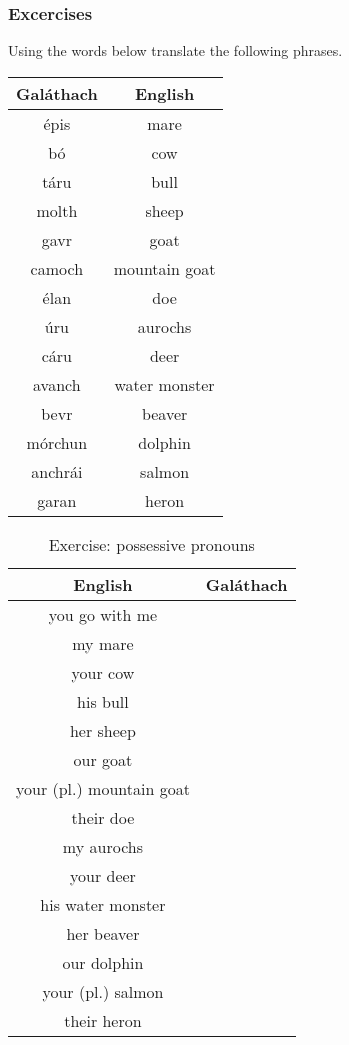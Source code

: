 \newpage
\subsubsection{Excercises}

Using the words below translate the following phrases.
\begin{table}[H]
\centering
\begin{tabular}{|c|c|}
  \toprule
  \textbf{Gal\'{a}thach} & \textbf{English}\\
  \toprule
  \'{e}pis & mare\\
  b\'{o} & cow\\
  t\'{a}ru & bull\\
  molth & sheep\\
  gavr & goat\\
  camoch & mountain goat\\
  \'{e}lan & doe\\
  \'{u}ru & aurochs\\
  c\'{a}ru & deer\\
  avanch & water monster\\
  bevr & beaver\\
  m\'{o}rchun & dolphin\\
  anchr\'{a}i & salmon\\
  garan & heron\\
  \bottomrule
\end{tabular}
\label{exercise_possessive_pronoun_vocab}
\end{table}

\begin{table}[H]
\centering
\begin{tabular}{|c|M{5.0cm}|}
  \toprule
  \textbf{English} & \textbf{Gal\'{a}thach}\\
  \toprule
  you go with me & \\
  \midrule
  my mare & \\
  \midrule
  your cow & \\
  \midrule
  his bull & \\
  \midrule
  her sheep & \\
  \midrule
  our goat & \\
  \midrule
  your (pl.) mountain goat & \\
  \midrule
  their doe & \\
  \midrule
  my aurochs & \\
  \midrule
  your deer & \\
  \midrule
  his water monster & \\
  \midrule
  her beaver & \\
  \midrule
  our dolphin & \\
  \midrule
  your (pl.) salmon & \\
  \midrule
  their heron & \\
  \bottomrule
\end{tabular}
\label{exercise_possessive_pronouns}
\caption{Exercise: possessive pronouns}
\end{table}

